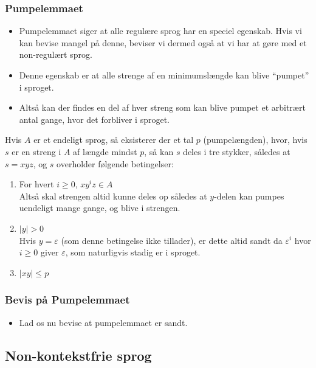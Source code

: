 \begin{frame}[allowframebreaks]
	\frametitle{Pumpelemmaet}
	\begin{itemize}
		\item Pumpelemmaet siger at alle regulære sprog har en speciel egenskab. Hvis vi kan bevise mangel på denne, beviser vi dermed også at vi har at gøre med et non-regulært sprog.
		\item Denne egenskab er at alle strenge af en minimumslængde kan blive ``pumpet'' i sproget.
		\item Altså kan der findes en del af hver streng som kan blive pumpet et arbitrært antal gange, hvor det forbliver i sproget.
	\end{itemize}

	\begin{theorem}[Pumpelemmaet]
		Hvis $A$ er et endeligt sprog, så eksisterer der et tal $p$ (pumpelængden), hvor, hvis $s$ er en streng i $A$ af længde mindst $p$, så kan $s$ deles i tre stykker, således at $s = xyz$, og $s$ overholder følgende betingelser:
		\begin{enumerate}
			\item For hvert $i \ge 0$, $xy^{i}z \in A$ \\ Altså skal strengen altid kunne deles op således at $y$-delen kan pumpes uendeligt mange gange, og blive i strengen.
			\item $|y| > 0$ \\ Hvis $y = \varepsilon$ (som denne betingelse ikke tillader), er dette altid sandt da $\varepsilon^{i}$ hvor $i \ge 0$  giver $\varepsilon$, som naturligvis stadig er i sproget.
			\item $|xy| \le p$
		\end{enumerate}
	\end{theorem}
\end{frame}

\begin{frame}[allowframebreaks]
	\frametitle{Bevis på Pumpelemmaet}
	\begin{itemize}
		\item Lad os nu bevise at pumpelemmaet er sandt.
	\end{itemize}
\end{frame}

\subsection{Non-kontekstfrie sprog}%
\label{subsec:nonkontekstfriesprog}


